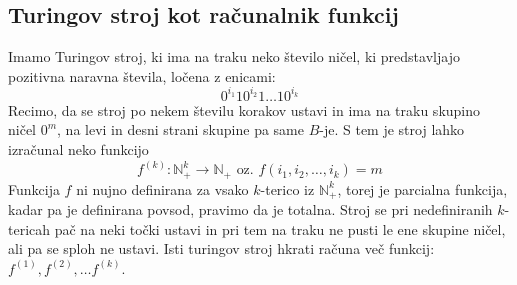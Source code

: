 \documentclass[10pt,a4paper,oneside]{book}
\begin{document}
\subsection{Turingov stroj kot računalnik funkcij}
Imamo Turingov stroj, ki ima na traku neko število ničel, ki predstavljajo pozitivna naravna števila, ločena z enicami:
	\[ 0^{i_1} 1 0^{i_2} 1  \dots 1 0^{i_k} \]
Recimo, da se stroj po nekem številu korakov ustavi in ima na traku skupino ničel $0^m$, na levi in desni strani skupine pa same $B$-je. S tem je stroj lahko izračunal neko funkcijo
	\[ f^{(k)}:\mathbb{N}_+^k \rightarrow \mathbb{N}_+ \mbox{\ \ oz. \ \ } f(i_1, i_2, \dots, i_k) = m \]
Funkcija $f$ ni nujno definirana za vsako $k$-terico iz $\mathbb{N}_+^k$, torej je parcialna funkcija, kadar pa je definirana povsod, pravimo da je totalna. Stroj se pri nedefiniranih $k$-tericah pač na neki točki ustavi in pri tem na traku ne pusti le ene skupine ničel, ali pa se sploh ne ustavi.
Isti turingov stroj hkrati računa več funkcij: $f^{(1)}, f^{(2)}, \dots f^{(k)}$.%
\end{document}
